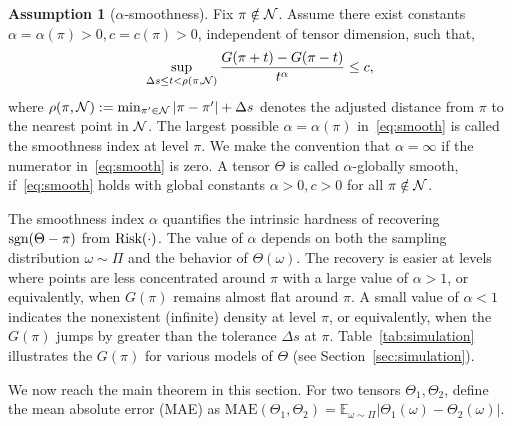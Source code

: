 \documentclass{article}
\theoremstyle{plain}
\theoremstyle{definition}
\newtheorem{assumption}{Assumption}
\def\sign{\textup{sgn}}
\def\risk{\textup{Risk}}
\begin{document}
\begin{assumption}[$\alpha$-smoothness]\label{ass:margin} Fix $\pi \notin \mathcal{N}$. Assume there exist constants $\alpha=\alpha(\pi)> 0, c=c(\pi) >0$, independent of tensor dimension, such that, 
\begin{equation}\label{eq:smooth}
\sup_{\Delta s \leq t<\rho(\pi, \mathcal{N})}{G(\pi+{t})-G(\pi-{t})\over t^\alpha} \leq c,
\end{equation}
where $\rho(\pi,\mathcal{N}):=\min_{\pi'\in \mathcal{N}}|\pi-\pi'|+\Delta s$ denotes the adjusted distance from $\pi$ to the nearest point in $\mathcal{N}$. The largest possible $\alpha=\alpha(\pi)$ in~\eqref{eq:smooth} is called the smoothness index at level $\pi$. We make the convention that $\alpha=\infty$ if the numerator in~\eqref{eq:smooth} is zero.
A tensor $\Theta$ is called $\alpha$-globally smooth, if~\eqref{eq:smooth} holds with global constants $\alpha>0, c>0$ for all $\pi\notin\mathcal{N}$. 
\end{assumption}

The smoothness index $\alpha$ quantifies the intrinsic hardness of recovering $\sign(\Theta-\pi)$ from $\risk(\cdot)$. 
The value of $\alpha$ depends on both the sampling distribution $\omega\sim \Pi$ and the behavior of $\Theta(\omega)$. 
The recovery is easier at levels where points are less concentrated around $\pi$ with a large value of $\alpha>1$, or equivalently, when $G(\pi)$ remains almost  flat around $\pi$. A small value of $\alpha<1$ indicates the nonexistent (infinite) density at level $\pi$, or equivalently, when the $G(\pi)$ jumps by greater than the tolerance $\Delta s$ at $\pi$. Table~\ref{tab:simulation} illustrates the $G(\pi)$ for various models of $\Theta$ (see Section~\ref{sec:simulation}). 


We now reach the main theorem in this section. For two tensors $\Theta_1,\Theta_2$, define the mean absolute error (MAE) as
$\text{MAE}(\Theta_1, \Theta_2)=\mathbb{E}_{\omega\sim \Pi}|\Theta_1(\omega)-\Theta_2(\omega)|.$
\end{document}
